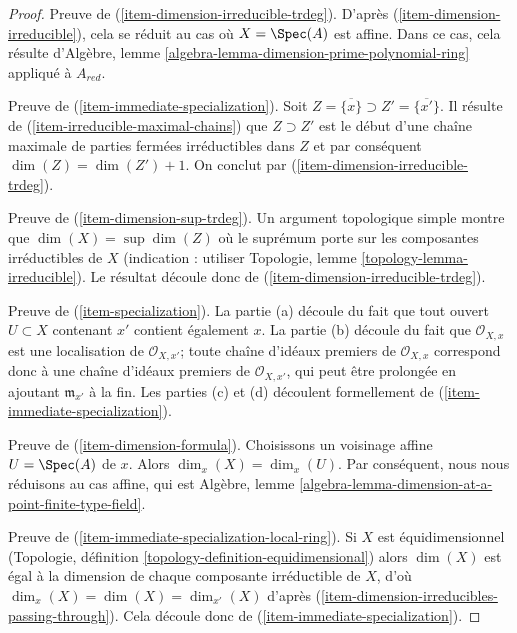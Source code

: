 \begin{proof}
\medskip\noindent
Preuve de (\ref{item-dimension-irreducible-trdeg}).
D'après (\ref{item-dimension-irreducible}), cela se
réduit au cas où $X = \Spec(A)$ est affine. Dans ce
cas, cela résulte d'Algèbre, lemme
\ref{algebra-lemma-dimension-prime-polynomial-ring} appliqué à $A_{red}$.

\medskip\noindent
Preuve de (\ref{item-immediate-specialization}).
Soit $Z = \overline{\{x\}} \supset Z' =
\overline{\{x'\}}$. Il résulte de
(\ref{item-irreducible-maximal-chains}) que $Z \supset Z'$
est le début d'une chaîne maximale de parties fermées
irréductibles dans $Z$ et par conséquent $\dim(Z) = \dim(Z') +
1$. On conclut par (\ref{item-dimension-irreducible-trdeg}).

\medskip\noindent
Preuve de (\ref{item-dimension-sup-trdeg}). Un argument
topologique simple montre que $\dim(X) = \sup \dim(Z)$ où le
suprémum porte sur les composantes irréductibles de $X$ (indication :
utiliser Topologie, lemme \ref{topology-lemma-irreducible}).
Le résultat découle donc de (\ref{item-dimension-irreducible-trdeg}).

\medskip\noindent
Preuve de (\ref{item-specialization}). La partie (a) découle du fait
que tout ouvert $U \subset X$ contenant $x'$ contient également $x$. La
partie (b) découle du fait que $\mathcal{O}_{X, x}$ est une localisation
de $\mathcal{O}_{X, x'}$; toute chaîne d'idéaux premiers de
$\mathcal{O}_{X, x}$ correspond donc à une chaîne d'idéaux premiers de $\mathcal{O}_{X,
x'}$, qui peut être prolongée en ajoutant $\mathfrak m_{x'}$ à la fin. Les
parties (c) et (d) découlent formellement de (\ref{item-immediate-specialization}).

\medskip\noindent
Preuve de (\ref{item-dimension-formula}). Choisissons un
voisinage affine $U = \Spec(A)$ de $x$. Alors $\dim_x(X) =
\dim_x(U)$. Par conséquent, nous nous réduisons au cas affine, qui est
Algèbre, lemme \ref{algebra-lemma-dimension-at-a-point-finite-type-field}.

\medskip\noindent
Preuve de
(\ref{item-immediate-specialization-local-ring}). Si $X$ est
équidimensionnel (Topologie, définition
\ref{topology-definition-equidimensional}) alors $\dim(X)$ est égal à la
dimension de chaque composante irréductible de $X$, d'où $\dim_x(X) =
\dim(X) = \dim_{x'}(X)$ d'après
(\ref{item-dimension-irreducibles-passing-through}). Cela découle donc de (\ref{item-immediate-specialization}).
\end{proof}

